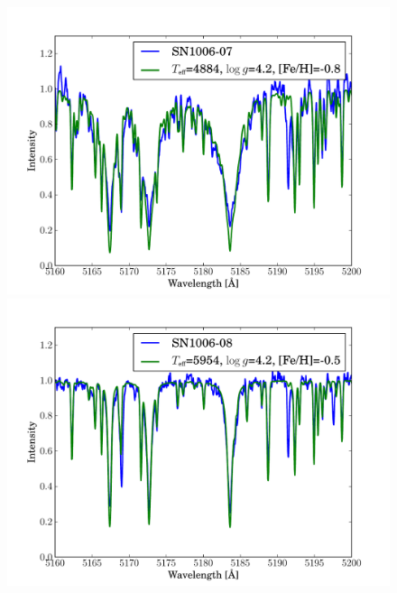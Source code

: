 \begin{figure}[tb]
   \label{fig:sn1006_candfit}
\end{figure}\begin{figure}[tb] %
   \centering
\includegraphics[width=1.1\textwidth, trim=0 0mm 0 10mm, clip]{chapter_sn1006/plots/gold_spectra/sn1006_07.pdf}
\includegraphics[width=1.1\textwidth, trim=0 0mm 0 10mm, clip]{chapter_sn1006/plots/gold_spectra/sn1006_08.pdf}


\end{figure}
